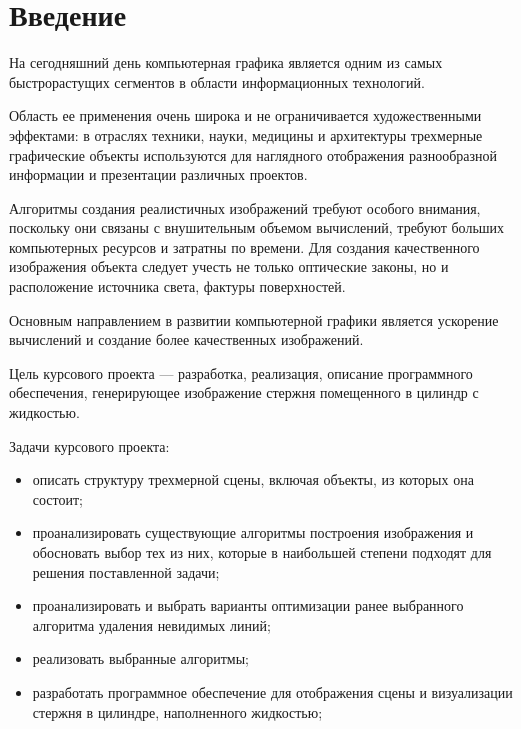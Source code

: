 \chapter*{Введение}

На сегодняшний день компьютерная графика является одним из самых быстрорастущих сегментов в области информационных технологий.

Область ее применения очень широка и не ограничивается художественными эффектами: в отраслях техники, науки, медицины и архитектуры трехмерные графические объекты используются для наглядного отображения разнообразной информации и презентации различных проектов.

Алгоритмы создания реалистичных изображений требуют особого внимания, поскольку они связаны с внушительным объемом вычислений, требуют больших компьютерных ресурсов и затратны по времени. Для создания качественного изображения объекта следует учесть не только оптические законы, но и расположение источника света, фактуры поверхностей. 

Основным направлением в развитии компьютерной графики является ускорение вычислений и создание более качественных изображений.

Цель курсового проекта --- разработка, реализация, описание программного обеспечения, генерирующее изображение стержня помещенного в цилиндр с жидкостью.   

\newpage

Задачи курсового проекта:

\begin{itemize}
	\item описать структуру трехмерной сцены, включая объекты, из которых она состоит;
	\item проанализировать существующие алгоритмы построения изображения и обосновать выбор тех из них, которые в наибольшей степени подходят для решения поставленной задачи;
	\item проанализировать и выбрать варианты оптимизации ранее выбранного алгоритма удаления невидимых линий;
	\item реализовать выбранные алгоритмы;
	\item разработать программное обеспечение для отображения сцены и визуализации стержня в цилиндре, наполненного жидкостью; 
\end{itemize}
